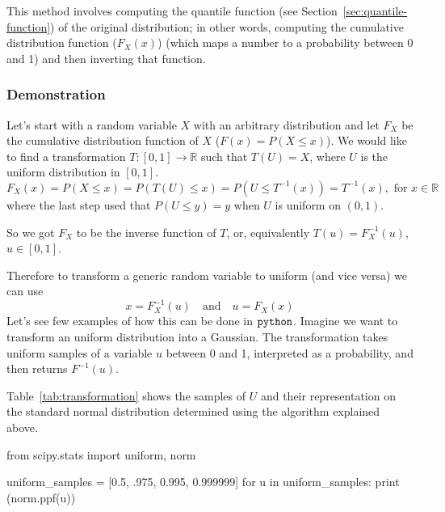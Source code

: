 This method involves computing the quantile function (see Section~\ref{sec:quantile-function}) of the original distribution; in other words, computing the cumulative distribution function ($F_X(x)$) (which maps a number to a probability between 0 and 1) and then inverting that function. 

\begin{attention}
\subsubsection{Demonstration}
Let's start with a random variable $X$ with an arbitrary distribution and let $F_X$ be the cumulative distribution function of $X$ (\(F(x) = P(X \leq x)\)). 
We would like to find a transformation $T:[0,1]\rightarrow\mathbb{R}$ such that $T(U)=X$, where $U$ is the uniform distribution in $[0,1]$. 
\begin{equation*}
F_{X}(x)= P(X\leq x)=P(T(U)\leq x)= P(U\leq T^{-1}(x))=T^{-1}(x),{\text{ for }}x\in \mathbb {R}
\end{equation*}
where the last step used that $P(U\leq y)=y$ when $U$ is uniform on $(0,1)$.

So we got $F_{X}$ to be the inverse function of $T$, or, equivalently $T(u)=F_{X}^{-1}(u)$, $u\in [0,1]$.
\end{attention}

Therefore to transform a generic random variable to uniform (and vice versa) we can use
\begin{equation}
x = F_{X}^{-1}(u)\quad\mathrm{and}\quad u = F_X(x)	
\end{equation} 
Let's see few examples of how this can be done in \(\tt{python}\). Imagine we want to transform an uniform distribution into a Gaussian. The transformation takes uniform samples of a variable \(u\) between 0 and 1, interpreted as a probability, and then returns $F^{-1}(u)$. 

Table~\ref{tab:transformation} shows the samples of $U$ and their representation on the standard normal distribution determined using the algorithm explained above.

\begin{ipython}
from scipy.stats import uniform, norm

uniform_samples = [0.5, .975, 0.995, 0.999999]
for u in uniform_samples:
    print (norm.ppf(u))
\end{ipython}

